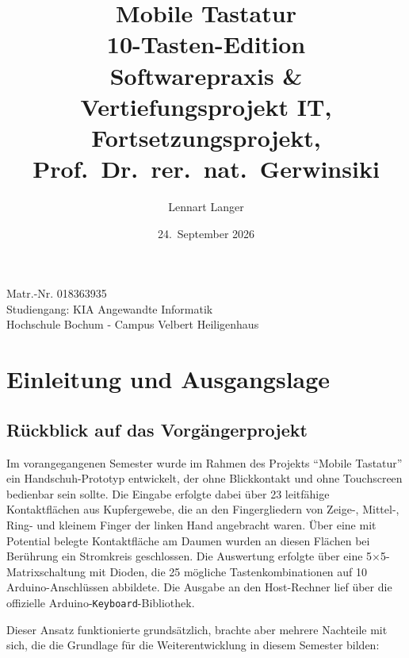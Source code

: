 \documentclass{article}
\title{Mobile Tastatur \\[0.2em] 10-Tasten-Edition
\normalsize\\[0.5em] Softwarepraxis \& Vertiefungsprojekt IT, Fortsetzungsprojekt, Prof.\ Dr.\ rer.\ nat.\ Gerwinsiki}
\author{Lennart Langer}
\date{24.~September 2026}
\begin{document}
\maketitle
\begin{center}
    Matr.-Nr. 018363935\\
    Studiengang: KIA Angewandte Informatik\\
    Hochschule Bochum - Campus Velbert Heiligenhaus
\end{center}

\newpage
\tableofcontents
\newpage

\section{Einleitung und Ausgangslage}

\subsection{Rückblick auf das Vorgängerprojekt}
Im vorangegangenen Semester wurde im Rahmen des Projekts \enquote{Mobile Tastatur} ein Handschuh-Prototyp entwickelt, der ohne Blickkontakt und ohne Touchscreen bedienbar sein sollte. Die Eingabe erfolgte dabei über 23 leitfähige Kontaktflächen aus Kupfergewebe, die an den Fingergliedern von Zeige-, Mittel-, Ring- und kleinem Finger der linken Hand angebracht waren. Über eine mit Potential belegte Kontaktfläche am Daumen wurden an diesen Flächen bei Berührung ein Stromkreis geschlossen. Die Auswertung erfolgte über eine 5$\times$5-Matrixschaltung mit Dioden, die 25 mögliche Tastenkombinationen auf 10 Arduino-Anschlüssen abbildete. Die Ausgabe an den Host-Rechner lief über die offizielle Arduino-\texttt{Keyboard}-Bibliothek.

Dieser Ansatz funktionierte grundsätzlich, brachte aber mehrere Nachteile mit sich, die die Grundlage für die Weiterentwicklung in diesem Semester bilden:
\end{document}
